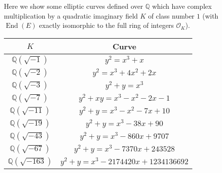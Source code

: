 \documentclass[12pt]{article}
\newcommand{\Rats}{\mathbb{Q}}
\begin{document}
Here we show some elliptic curves defined over $\Rats$ which have complex multiplication by a quadratic imaginary field $K$ of class number $1$ (with $\operatorname{End}(E)$ exactly isomorphic to the full ring of integers $\mathcal{O}_K$).

\begin{center}
\begin{tabular}{|c|c|}
  \hline
  $K$ & {\bf Curve} \\
  \hline
  $\Rats(\sqrt{-1})$ & $y^2=x^3+x$ \\
  $\Rats(\sqrt{-2})$ & $y^2=x^3+4x^2+2x$ \\
  $\Rats(\sqrt{-3})$ & $y^2+y=x^3$ \\
  $\Rats(\sqrt{-7})$ & $y^2+xy=x^3-x^2-2x-1$ \\
  $\Rats(\sqrt{-11})$ & $y^2+y=x^3-x^2-7x+10$ \\
  $\Rats(\sqrt{-19})$ & $y^2+y=x^3-38x+90$ \\
  $\Rats(\sqrt{-43})$ & $y^2+y=x^3-860x+9707$ \\
  $\Rats(\sqrt{-67})$ & $y^2+y=x^3-7370x+243528$ \\
  $\Rats(\sqrt{-163})$ & $y^2+y=x^3-2174420x+1234136692$ \\
  \hline
\end{tabular}
\end{center}
\end{document}
